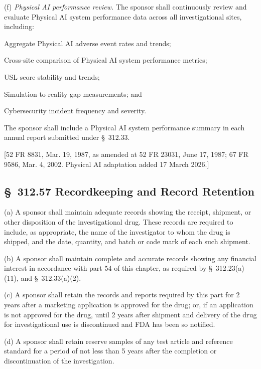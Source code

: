 \documentclass[11pt]{article}
\begin{document}
(f) \textit{Physical AI performance review.} The sponsor shall continuously review and evaluate Physical AI system performance data across all investigational sites, including:

\begin{description}[leftmargin=0.8cm,style=sameline]
\item[(i)] Aggregate Physical AI adverse event rates and trends;
\item[(ii)] Cross-site comparison of Physical AI system performance metrics;
\item[(iii)] USL score stability and trends;
\item[(iv)] Simulation-to-reality gap measurements; and
\item[(v)] Cybersecurity incident frequency and severity.
\end{description}

The sponsor shall include a Physical AI system performance summary in each annual report submitted under \S~312.33.

[52 FR 8831, Mar. 19, 1987, as amended at 52 FR 23031, June 17, 1987; 67 FR 9586, Mar. 4, 2002. Physical AI adaptation added 17 March 2026.]

\subsection{\S~312.57 Recordkeeping and Record Retention}

(a) A sponsor shall maintain adequate records showing the receipt, shipment, or other disposition of the investigational drug. These records are required to include, as appropriate, the name of the investigator to whom the drug is shipped, and the date, quantity, and batch or code mark of each such shipment.

(b) A sponsor shall maintain complete and accurate records showing any financial interest in accordance with part 54 of this chapter, as required by \S~312.23(a)(11), and \S~312.33(a)(2).

(c) A sponsor shall retain the records and reports required by this part for 2 years after a marketing application is approved for the drug; or, if an application is not approved for the drug, until 2 years after shipment and delivery of the drug for investigational use is discontinued and FDA has been so notified.

(d) A sponsor shall retain reserve samples of any test article and reference standard for a period of not less than 5 years after the completion or discontinuation of the investigation.
\end{document}
